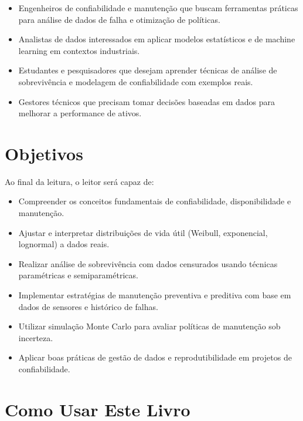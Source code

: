 \documentclass[
  letterpaper,
]{book}
\providecommand{\tightlist}{%
  \setlength{\itemsep}{0pt}\setlength{\parskip}{0pt}}\usepackage{longtable,booktabs,array}
\begin{document}
\begin{itemize}
\tightlist
\item
  Engenheiros de confiabilidade e manutenção que buscam ferramentas
  práticas para análise de dados de falha e otimização de políticas.
\item
  Analistas de dados interessados em aplicar modelos estatísticos e de
  machine learning em contextos industriais.
\item
  Estudantes e pesquisadores que desejam aprender técnicas de análise de
  sobrevivência e modelagem de confiabilidade com exemplos reais.
\item
  Gestores técnicos que precisam tomar decisões baseadas em dados para
  melhorar a performance de ativos.
\end{itemize}

\section*{Objetivos}\label{objetivos}


Ao final da leitura, o leitor será capaz de:

\begin{itemize}
\tightlist
\item
  Compreender os conceitos fundamentais de confiabilidade,
  disponibilidade e manutenção.
\item
  Ajustar e interpretar distribuições de vida útil (Weibull,
  exponencial, lognormal) a dados reais.
\item
  Realizar análise de sobrevivência com dados censurados usando técnicas
  paramétricas e semiparamétricas.
\item
  Implementar estratégias de manutenção preventiva e preditiva com base
  em dados de sensores e histórico de falhas.
\item
  Utilizar simulação Monte Carlo para avaliar políticas de manutenção
  sob incerteza.
\item
  Aplicar boas práticas de gestão de dados e reprodutibilidade em
  projetos de confiabilidade.
\end{itemize}

\section*{Como Usar Este Livro}\label{como-usar-este-livro}
\end{document}
